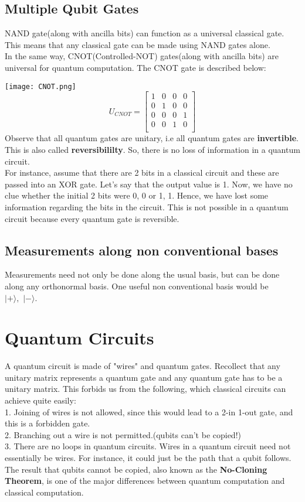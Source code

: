 \documentclass{article}
\begin{document}
\subsection{Multiple Qubit Gates}
NAND gate(along with ancilla bits) can function as a universal classical gate. This means that any classical gate can be made using NAND gates alone. \\[3pt]
In the same way, CNOT(Controlled-NOT) gates(along with ancilla bits) are universal for quantum computation. The CNOT gate is described below:

\texttt{[image: CNOT.png]}\\[3pt]
$$U_{CNOT} = \begin{bmatrix}
1 & 0 & 0 & 0 \\
0 & 1 & 0 & 0 \\
0 & 0 & 0 & 1 \\
0 & 0 & 1 & 0 \\
\end{bmatrix}$$
Observe that all quantum gates are unitary, i.e all quantum gates are \textbf{invertible}. This is also called \textbf{reversibililty}. So, there is no loss of information in a quantum circuit. \\[3pt]
For instance, assume that there are 2 bits in a classical circuit and these are passed into an XOR gate. Let's say that the output value is 1. Now, we have no clue whether the initial 2 bits were {0, 0} or {1, 1}. Hence, we have lost some information regarding the bits in the circuit. This is not possible in a quantum circuit because every quantum gate is reversible.

\subsection{Measurements along non conventional bases}
Measurements need not only be done along the usual basis, but can be done along any orthonormal basis. One useful non conventional basis would be $|+ \rangle ,\,\, |- \rangle$.

\cleardoublepage
\section{Quantum Circuits}
A quantum circuit is made of "wires" and quantum gates. Recollect that any unitary matrix represents a quantum gate and any quantum gate has to be a unitary matrix. This forbids us from the following, which classical circuits can achieve quite easily:\\[3pt]
1. Joining of wires is not allowed, since this would lead to a 2-in 1-out gate, and this is a forbidden gate. \\[3pt]
2. Branching out a wire is not permitted.(qubits can't be copied!)\\[3pt]
3. There are no loops in quantum circuits.
Wires in a quantum circuit need not essentially be wires. For instance, it could just be the path that a qubit follows.\\[3pt]
The result that qubits cannot be copied, also known as the \textbf{No-Cloning Theorem}, is one of the major differences between quantum computation and classical computation.
\end{document}
